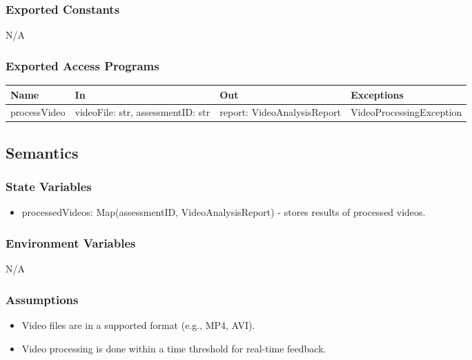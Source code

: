 \documentclass[12pt, titlepage]{article}
\begin{document}
\subsubsection{Exported Constants}
N/A

\subsubsection{Exported Access Programs}
\begin{center}
  \begin{tabular}{p{3cm} p{4cm} p{4cm} p{5cm}}
  \hline
  \textbf{Name} & \textbf{In} & \textbf{Out} & \textbf{Exceptions} \\
  \hline
  processVideo & \raggedright\arraybackslash videoFile: str, assessmentID: str & \raggedright\arraybackslash report: VideoAnalysisReport & \raggedright\arraybackslash VideoProcessingException \\
  \end{tabular}
\end{center}

\subsection{Semantics}

\subsubsection{State Variables}
\begin{itemize}
\item processedVideos: Map(assessmentID, VideoAnalysisReport) - stores results of processed videos.
\end{itemize}

\subsubsection{Environment Variables}
N/A

\subsubsection{Assumptions}
\begin{itemize}
\item Video files are in a supported format (e.g., MP4, AVI).
\item Video processing is done within a time threshold for real-time feedback.
\end{itemize}
\end{document}
